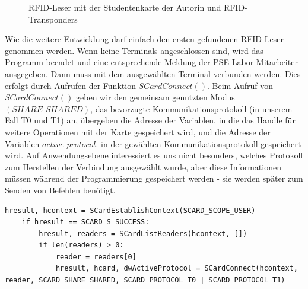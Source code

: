\begin{figure}
	\caption{RFID-Leser mit der Studentenkarte der Autorin und RFID-Transponders}
	\label{fig:baga_stud}
\end{figure} 
Wie die weitere Entwicklung darf einfach den ersten gefundenen RFID-Leser genommen werden. Wenn keine Terminals angeschlossen sind, wird das Programm beendet und eine entsprechende Meldung der PSE-Labor Mitarbeiter ausgegeben. Dann muss mit dem ausgewählten Terminal verbunden werden. Dies erfolgt durch Aufrufen der Funktion $SCardConnect()$. Beim Aufruf von $SCardConnect()$ geben wir den gemeinsam genutzten Modus $(SHARE\_SHARED)$, das bevorzugte Kommunikationsprotokoll (in unserem Fall T0 und T1) an, übergeben die Adresse der Variablen, in die das Handle für weitere Operationen mit der Karte gespeichert wird, und die Adresse der Variablen $active\_protocol$. in der gewählten Kommunikationsprotokoll gespeichert wird. Auf Anwendungsebene interessiert es uns nicht besonders, welches Protokoll zum Herstellen der Verbindung ausgewählt wurde, aber diese Informationen müssen während der Programmierung gespeichert werden - sie werden später zum Senden von Befehlen benötigt\cite[p. 104]{chirico:smart_card}.
\begin{lstlisting}[caption={Funktion SCardEstablishContext},captionpos=b]
hresult, hcontext = SCardEstablishContext(SCARD_SCOPE_USER)
	if hresult == SCARD_S_SUCCESS:
		hresult, readers = SCardListReaders(hcontext, [])
		if len(readers) > 0:
			reader = readers[0]
			hresult, hcard, dwActiveProtocol = SCardConnect(hcontext, reader, SCARD_SHARE_SHARED, SCARD_PROTOCOL_T0 | SCARD_PROTOCOL_T1)
\end{lstlisting}

